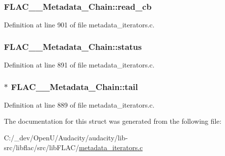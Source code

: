 \subsubsection[{\texorpdfstring{read\+\_\+cb}{read_cb}}]{ F\+L\+A\+C\+\_\+\+\_\+\+Metadata\+\_\+\+Chain\+::read\+\_\+cb}\hypertarget{struct_f_l_a_c_____metadata___chain_a5a885df32c675b12f4b3309dc2fae365}{}\label{struct_f_l_a_c_____metadata___chain_a5a885df32c675b12f4b3309dc2fae365}


Definition at line 901 of file metadata\+\_\+iterators.\+c.

\subsubsection[{\texorpdfstring{status}{status}}]{ F\+L\+A\+C\+\_\+\+\_\+\+Metadata\+\_\+\+Chain\+::status}\hypertarget{struct_f_l_a_c_____metadata___chain_aa3d88867863b83bcfd6f8ce21142b571}{}\label{struct_f_l_a_c_____metadata___chain_aa3d88867863b83bcfd6f8ce21142b571}


Definition at line 891 of file metadata\+\_\+iterators.\+c.

\subsubsection[{\texorpdfstring{tail}{tail}}]{$\ast$ F\+L\+A\+C\+\_\+\+\_\+\+Metadata\+\_\+\+Chain\+::tail}\hypertarget{struct_f_l_a_c_____metadata___chain_abbdb660c2b89c6716e528f9569f30860}{}\label{struct_f_l_a_c_____metadata___chain_abbdb660c2b89c6716e528f9569f30860}


Definition at line 889 of file metadata\+\_\+iterators.\+c.



The documentation for this struct was generated from the following file\+:\begin{DoxyCompactItemize}
\item 
C\+:/\+\_\+dev/\+Open\+U/\+Audacity/audacity/lib-\/src/libflac/src/lib\+F\+L\+A\+C/\hyperlink{metadata__iterators_8c}{metadata\+\_\+iterators.\+c}\end{DoxyCompactItemize}
